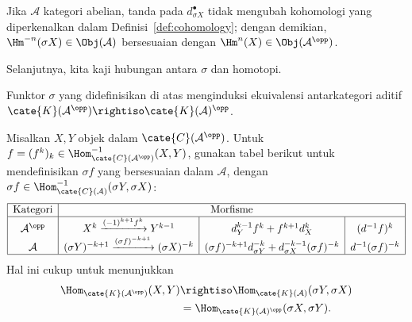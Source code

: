 \begin{catatan}\label{rem:sigma-vs-cohomology}
	Jika $\mathcal{A}$ kategori abelian, tanda pada $d_{\sigma X}^\bullet$
	tidak mengubah kohomologi yang diperkenalkan dalam
	Definisi~\ref{def:cohomology}; dengan demikian,
	$\Hm^{-n}(\sigma X)\in\Obj(\mathcal{A})$ bersesuaian dengan
	$\Hm^n(X)\in\Obj(\mathcal{A}^{\opp})$.
\end{catatan}

Selanjutnya, kita kaji hubungan antara $\sigma$ dan homotopi.

\begin{proposisi}\label{prop:sigma-homotopy}
	Funktor $\sigma$ yang didefinisikan di atas menginduksi ekuivalensi
	antarkategori aditif
	$\cate{K}(\mathcal{A}^{\opp})\rightiso\cate{K}(\mathcal{A})^{\opp}$.
\end{proposisi}
\begin{bukti}
	Misalkan $X,Y$ objek dalam $\cate{C}(\mathcal{A}^{\opp})$. Untuk
	$f=(f^k)_k\in\Hom^{-1}_{\cate{C}(\mathcal{A}^{\opp})}(X,Y)$, gunakan
	tabel berikut untuk mendefinisikan $\sigma f$ yang bersesuaian dalam
	$\mathcal{A}$, dengan
	$\sigma f\in\Hom^{-1}_{\cate{C}(\mathcal{A})}(\sigma Y,\sigma X)$:
	\begingroup\setlength{\arraycolsep}{4pt}
	\[\begin{array}{|c|c|c|c|} \hline
		\text{Kategori} & \multicolumn{3}{c|}{\text{Morfisme}} \\ \hline
		\mathcal{A}^{\opp} & X^k \xrightarrow{(-1)^{k+1} f^k} Y^{k-1} & d_Y^{k-1} f^k + f^{k+1} d_X^k & (d^{-1}f)^k \\
		\mathcal{A} & (\sigma Y)^{-k+1} \xrightarrow{(\sigma f)^{-k+1}} (\sigma X)^{-k} & (\sigma f)^{-k+1} d_{\sigma Y}^{-k} + d_{\sigma X}^{-k-1} (\sigma f)^{-k} & d^{-1} (\sigma f)^{-k} \\ \hline
	\end{array}\]
	\endgroup
	Hal ini cukup untuk menunjukkan
	\[\begin{aligned}
		\Hom_{\cate{K}(\mathcal{A}^{\opp})}(X, Y)
		&\rightiso \Hom_{\cate{K}(\mathcal{A})}(\sigma Y, \sigma X) \\
		&= \Hom_{\cate{K}(\mathcal{A})^{\opp}}(\sigma X, \sigma Y).
	\end{aligned}\]
\end{bukti}

